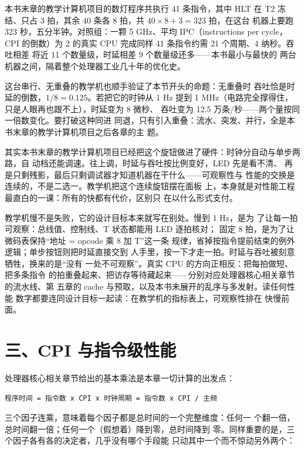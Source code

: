 本书末章的教学计算机项目的数灯程序共执行 41 条指令，其中 HLT 在 T2 冻结、只占 3 拍，其余 40 条各 8 拍，共 $40\times8+3=323$ 拍，在这台
机器上要跑 323 秒，五分半钟。对照组：一颗 5 GHz、平均 IPC（instructions per cycle，CPI 的倒数）为 2
的真实 CPU 完成同样 41 条指令约需 21 个周期、4 纳秒。吞吐相差
将近 11 个数量级，时延相差 9 个数量级还多——本书最小与最快的
两台机器之间，隔着整个处理器工业几十年的优化史。

这台串行、无重叠的教学机也顺手验证了本节开头的命题：无重叠时
吞吐恰是时延的倒数，$1/8=0.125$。若把它的时钟从 1 Hz 提到 1
MHz（电路完全撑得住，只是人眼再也跟不上），时延变为 8 微秒、
吞吐变为 12.5 万条/秒——两个量按同一倍数变化。要打破这种同进
同退，只有引入重叠：流水、突发、并行，全是本书末章的教学计算机项目之后各章的主
题。

其实本书末章的教学计算机项目已经把这个旋钮做进了硬件：时钟分自动与单步两路，自
动档还能调速。往上调，时延与吞吐按比例变好，LED 先是看不清、
再是只剩残影，最后只剩调试器才知道机器在干什么——可观察性与
性能的交换是连续的，不是二选一。教学机把这个连续旋钮摆在面板
上，本身就是对性能工程最直白的一课：所有的快都有代价，区别只
在以什么形式支付。

教学机慢不是失败，它的设计目标本来就写在别处。慢到 1 Hz，是为
了让每一拍可观察：总线值、控制线、T 状态都能用 LED 逐拍核对；
固定 8 拍，是为了让微码表保持“地址 = opcode 乘 8 加 T”这一条
规律，省掉按指令提前结束的例外逻辑；单步按钮则把时延直接交到
人手里，按一下才走一拍。时延与吞吐被刻意牺牲，换来的是“没有
一处不可观察”。真实 CPU 的方向正相反：把每拍做短、把多条指令
的拍重叠起来、把访存等待藏起来——分别对应处理器核心相关章节的流水线、第
五章的 cache 与预取，以及本书未展开的乱序与多发射。读任何性能
数字都要连同设计目标一起读：在教学机的指标表上，可观察性排在
快慢前面。

\section{三、CPI 与指令级性能}

处理器核心相关章节给出的基本乘法是本章一切计算的出发点：

\begin{lstlisting}
程序时间 = 指令数 x CPI x 时钟周期 = 指令数 x CPI / 主频
\end{lstlisting}

三个因子连乘，意味着每个因子都是总时间的一个完整维度：任何一
个翻一倍，总时间翻一倍；任何一个（假想着）降到零，总时间降到
零。同样重要的是，三个因子各有各的决定者，几乎没有哪个手段能
只动其中一个而不惊动另外两个：


